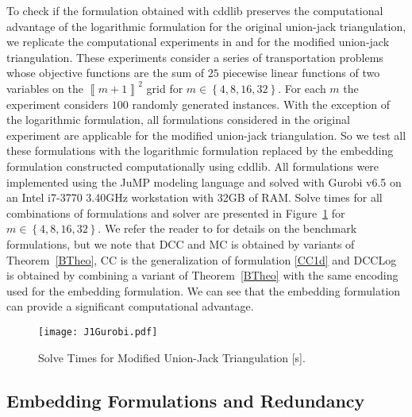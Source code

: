 \documentclass[mnsc]{informs3}
\newcommand{\set}[1]{\left\{#1\right\}}                     %
\newcommand{\sidx}[1]{\left\llbracket     #1 \right\rrbracket}
\begin{document}
To check if the formulation obtained with cddlib preserves the computational advantage of the logarithmic formulation for the original  union-jack triangulation, we replicate the computational experiments in   \cite{Modeling-Disjunctive-Constraints-FULL} and \cite{Mixed-Integer-Models-for-Nonseparable} for the modified union-jack triangulation. These experiments consider a series of transportation problems whose objective functions are the sum of $25$ piecewise linear functions of two variables on the $\sidx{m+1}^2$ grid for $m\in \set{4,8,16,32}$. For each $m$ the experiment considers $100$ randomly generated instances. With the exception of the logarithmic formulation, all formulations considered  in the original experiment are applicable for the modified union-jack triangulation. So we test all these formulations with the logarithmic formulation replaced by the embedding formulation constructed computationally using cddlib. All formulations were implemented using the JuMP modeling language \citep{jump,LubinDunningIJOC,DunningHuchetteLubin2015} and solved with Gurobi v6.5 \citep{gurobi} on an Intel i7-3770 3.40GHz workstation with 32GB of RAM. Solve times for all combinations of formulations and solver are presented in Figure~\ref{resfig1} for $m\in \set{4,8,16,32}$. We refer the reader to \cite{Mixed-Integer-Models-for-Nonseparable} for details on the benchmark formulations, but we note that DCC and MC is obtained by variants of Theorem~\ref{BTheo}, CC is the generalization of formulation \eqref{CC1d} and DCCLog is obtained by combining a variant of Theorem~\ref{BTheo} with the same encoding used for the embedding formulation. We can see that the embedding formulation can provide a significant computational advantage.
\begin{figure}[htpb]
  \begin{center}
  \texttt{[image: J1Gurobi.pdf]}
  \end{center}
  \caption{Solve Times for Modified Union-Jack Triangulation [s].}\label{resfig1}
  \end{figure}

\subsection{Embedding Formulations and Redundancy}\label{redundancysection}
\end{document}
